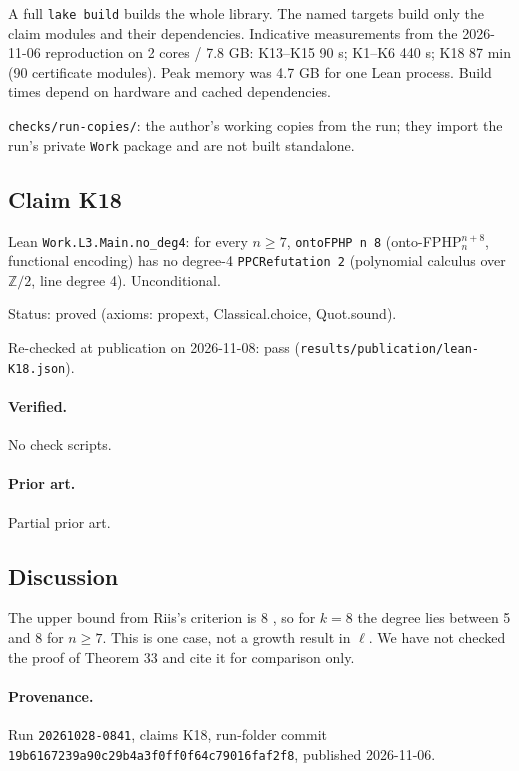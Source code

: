 \documentclass{article}
\begin{document}
A full \texttt{lake build} builds the whole library. The named targets build only the claim modules and their dependencies. Indicative measurements from the 2026-11-06 reproduction on 2 cores / 7.8 GB: K13--K15 90 s; K1--K6 440 s; K18 87 min (90 certificate modules). Peak memory was 4.7 GB for one Lean process. Build times depend on hardware and cached dependencies.

\texttt{checks/run-copies/}: the author's working copies from the run; they import the run's private \texttt{Work} package and are not built standalone.

\subsection*{Claim K18}

Lean \texttt{Work.L3.Main.no\_deg4}: for every $n\ge7$, \texttt{ontoFPHP n 8} (onto-FPHP$^{n+8}_n$, functional encoding) has no degree-4 \texttt{PPCRefutation 2} (polynomial calculus over $\mathbb Z/2$, line degree 4). Unconditional.

Status: proved (axioms: propext, Classical.choice, Quot.sound).

Re-checked at publication on 2026-11-08: pass (\texttt{results/publication/lean-K18.json}).

\paragraph{Verified.}
No check scripts.

\paragraph{Prior art.} Partial prior art.

\subsection*{Discussion}

The upper bound from Riis's criterion is 8 \cite{riis1993independence,razborov2001php}, so for
$k=8$ the degree lies between 5 and 8 for $n\ge7$. This is one case, not a growth result in
$\ell$. We have not checked the proof of Theorem 33 and cite it for comparison only.

\paragraph{Provenance.}
Run \texttt{20261028-0841}, claims K18, run-folder commit \texttt{19b6167239a90c29b4a3f0ff0f64c79016faf2f8}, published 2026-11-06.
\end{document}
